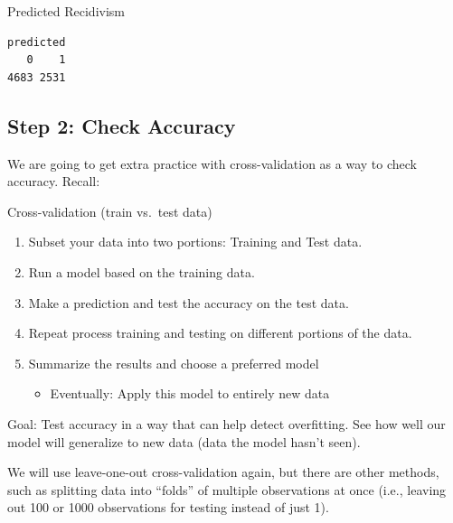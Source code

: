 \documentclass[
  letterpaper,
  DIV=11,
  numbers=noendperiod]{scrreprt}
\newenvironment{Shaded}{\begin{snugshade}}{\end{snugshade}}
\newcommand{\AttributeTok}[1]{\textcolor[rgb]{0.40,0.45,0.13}{#1}}
\newcommand{\FunctionTok}[1]{\textcolor[rgb]{0.28,0.35,0.67}{#1}}
\newcommand{\NormalTok}[1]{\textcolor[rgb]{0.00,0.23,0.31}{#1}}
\newcommand{\SpecialCharTok}[1]{\textcolor[rgb]{0.37,0.37,0.37}{#1}}
\providecommand{\tightlist}{%
  \setlength{\itemsep}{0pt}\setlength{\parskip}{0pt}}\usepackage{longtable,booktabs,array}
\begin{document}
Predicted Recidivism

\begin{Shaded}
\end{Shaded}

\begin{verbatim}
predicted
   0    1 
4683 2531 
\end{verbatim}

\hypertarget{step-2-check-accuracy-1}{%
\subsection{Step 2: Check Accuracy}\label{step-2-check-accuracy-1}}

We are going to get extra practice with cross-validation as a way to
check accuracy. Recall:

Cross-validation (train vs.~test data)

\begin{enumerate}
\def\labelenumi{\arabic{enumi}.}
\tightlist
\item
  Subset your data into two portions: Training and Test data.
\item
  Run a model based on the training data.
\item
  Make a prediction and test the accuracy on the test data.
\item
  Repeat process training and testing on different portions of the data.
\item
  Summarize the results and choose a preferred model

  \begin{itemize}
  \tightlist
  \item
    Eventually: Apply this model to entirely new data
  \end{itemize}
\end{enumerate}

Goal: Test accuracy in a way that can help detect overfitting. See how
well our model will generalize to new data (data the model hasn't seen).

We will use leave-one-out cross-validation again, but there are other
methods, such as splitting data into ``folds'' of multiple observations
at once (i.e., leaving out 100 or 1000 observations for testing instead
of just 1).
\end{document}

